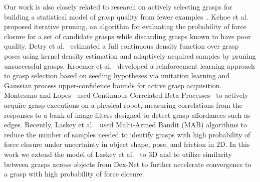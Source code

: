 Our work is also closely related to research on actively selecting grasps for building a statistical model of grasp quality from fewer examples~\cite{salganicoff1996active}.
Kehoe et al.~\cite{kehoe2012estimating} proposed iterative pruning, an algorithm for evaluating the probability of force closure for a set of candidate grasps while discarding grasps known to have poor quality.
Detry et al.~\cite{detry2011learning} estimated a full continuous density function over grasp poses using kernel density estimation and adaptively acquired samples by pruning unsuccessful grasps.
Kroemer et al.~\cite{kroemer2010combining} developed a reinforcement learning approach to grasp selection based on seeding hypotheses via imitation learning and Gaussian process upper-confidence bounds for active grasp acquisition.
Montesano and Lopes~\cite{montesano2012active} used Continuous Correlated Beta Processes~\cite{goetschalckx2011continuous} to actively acquire grasp executions on a physical robot, measuring correlations from the responses to a bank of image filters designed to detect grasp affordances such as edges.
Recently, Laskey et al.~\cite{laskey2015bandits} used Multi-Armed Bandit (MAB) algorithms to reduce the number of samples needed to identify grasps with high probability of force closure under uncertainty in object shape, pose, and friction in 2D.
In this work we extend the model of Laskey et al.~\cite{laskey2015bandits} to 3D and to utilize similarity between grasps across objects from Dex-Net to further accelerate convergence to a grasp with high probability of force closure.

